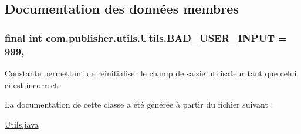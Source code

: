 \subsection{Documentation des données membres}
\hypertarget{classcom_1_1publisher_1_1utils_1_1Utils_a9fea6ecddb80eabef5ae8976e8f65d81}{
\subsubsection[{B\-A\-D\-\_\-\-U\-S\-E\-R\-\_\-\-I\-N\-P\-U\-T}]{\setlength{\rightskip}{0pt plus 5cm}final int com.\-publisher.\-utils.\-Utils.\-B\-A\-D\-\_\-\-U\-S\-E\-R\-\_\-\-I\-N\-P\-U\-T = 999\hspace{0.3cm}{\ttfamily [static]}, {\ttfamily [private]}}}\label{classcom_1_1publisher_1_1utils_1_1Utils_a9fea6ecddb80eabef5ae8976e8f65d81}
Constante permettant de réinitialiser le champ de saisie utilisateur tant que celui ci est incorrect. 

La documentation de cette classe a été générée à partir du fichier suivant \-:\begin{DoxyCompactItemize}
\item 
\hyperlink{Utils_8java}{Utils.\-java}\end{DoxyCompactItemize}

